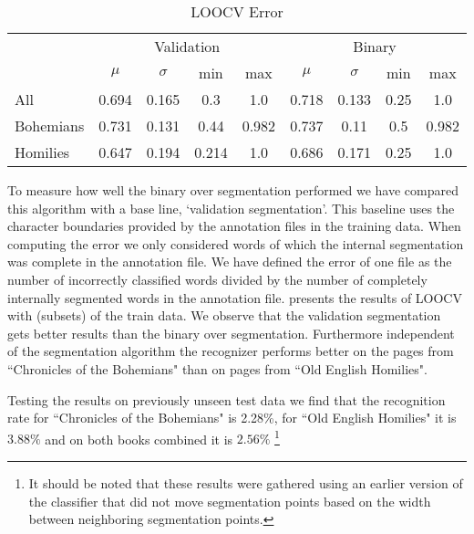 \begin{table*}[t]
\caption{LOOCV Error}
\label{tab:results:loocv}
\centering
	\begin{tabular}{lcccccccc}
		\toprule
					& \multicolumn{4}{c}{Validation} & \multicolumn{4}{c}{Binary}\\
					\cmidrule(r){2-5} \cmidrule(r){6-9}
		~ 			& $\mu$ 	& $\sigma$ 	& min 	& max 	& $\mu$ 	& $\sigma$ 	& min 	& max \\
		\midrule
		All 		& 0.694 	& 0.165 	& 0.3 	& 1.0 	& 0.718 	& 0.133 	& 0.25 	& 1.0 \\
		Bohemians 	& 0.731 	& 0.131 	& 0.44 	& 0.982 & 0.737 	& 0.11 		& 0.5 	& 0.982 \\
		Homilies 	& 0.647 	& 0.194 	& 0.214 & 1.0 	& 0.686 	& 0.171 	& 0.25 	& 1.0 \\
		\bottomrule
	\end{tabular}
\end{table*}
%
To measure how well the binary over segmentation performed we have compared this algorithm with a base line, `validation segmentation'. This baseline uses the character boundaries provided by the annotation files in the training data. When computing the error we only considered words of which the internal segmentation was complete in the annotation file. We have defined the error of one file as the number of incorrectly classified words divided by the number of completely internally segmented words in the annotation file.  presents the results of LOOCV with (subsets) of the train data. We observe that the validation segmentation gets better results than the binary over segmentation. Furthermore independent of the segmentation algorithm the recognizer performs better on the pages from ``Chronicles of the Bohemians" than on pages from ``Old English Homilies".

Testing the results on previously unseen test data we find that the recognition rate for ``Chronicles of the Bohemians" is 2.28\%, for ``Old English Homilies" it is $3.88\%$ and on both books combined it is $2.56\%$ \footnote{It should be noted that these results were gathered using an earlier version of the classifier that did not move segmentation points based on the width between neighboring segmentation points.}